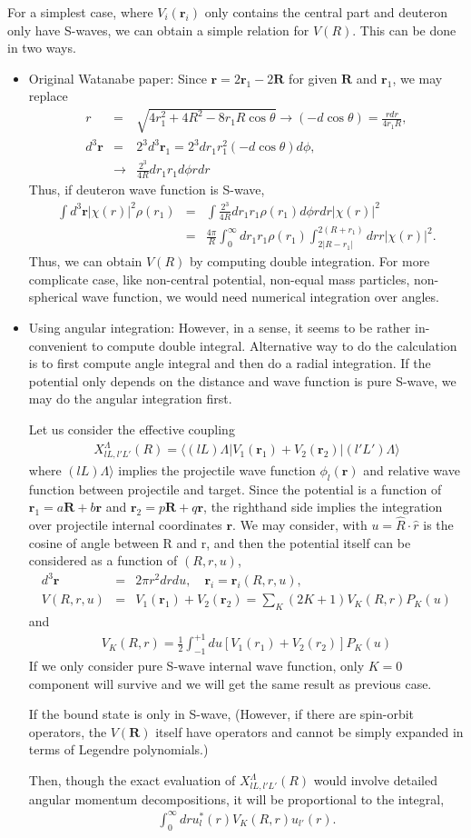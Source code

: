\documentclass[11pt]{book}
\def\bm{\boldsymbol}
\def\vr{{\bm r}}
\def\vR{{\bm R}}
\def\la{\langle}
\def\ra{\rangle}
\newcommand{\bea}{\begin{eqnarray}}
\newcommand{\eea}{\end{eqnarray}}
\newcommand{\no}{\nonumber \\}
\begin{document}
For a simplest case, where 
$V_i(\vr_i)$ only contains the central part and deuteron only have S-waves,
we can obtain a simple relation for $V(R)$.
This can be done in two ways. 
\begin{itemize}
\item Original Watanabe paper:
Since $\vr=2\vr_1-2\vR$ for given $\vR$ and $\vr_1$, we may replace
\bea 
r &=& \sqrt{4r_1^2+4R^2-8r_1 R\cos\theta}\to (-d\cos\theta)=\frac{rdr}{4 r_1 R}, \no 
d^3\vr&=& 2^3  d^3 \vr_1 = 2^3 d r_1 r_1^2 (-d\cos\theta) d\phi, \no 
      &\to& \frac{2^3}{4R} d r_1 r_1 d\phi r dr
\eea 
Thus, if deuteron wave function is S-wave,
\bea 
\int d^3\vr |\chi(r)|^2 \rho(r_1)
&=& \int \frac{2^3}{4R} d r_1 r_1 \rho(r_1) d\phi r dr |\chi(r)|^2 \no 
&=& \frac{4\pi}{R}\int_0^\infty dr_1 r_1 \rho(r_1) 
                          \int_{2|R-r_1|}^{2(R+r_1)} dr r |\chi(r)|^2.
\eea 
Thus, we can obtain $V(R)$ by computing double integration. 
For more complicate case, like non-central potential, non-equal mass particles,
non-spherical wave function, we would need numerical integration over angles.

\item Using angular integration:
However, in a sense, it seems to be rather in-convenient to compute 
double integral. Alternative way to do the calculation is to first compute angle
integral and then do a radial integration. 
If the potential only depends on the distance and wave function is 
pure S-wave, we may do the angular integration first.

Let us consider the effective coupling
\bea 
X^\Lambda_{lL,l'L'}(R)=\la (l L)\Lambda | V_1(\vr_1)+V_2(\vr_2)|(l' L')\Lambda\ra 
\eea 
where $(lL)\Lambda\ra$ implies the projectile wave function $\phi_l(\vr)$
and relative wave function between projectile and target. 
Since the potential is a function of $\vr_1=a \vR+b \vr$ and
$\vr_2=p \vR+ q\vr$, the righthand side implies the integration
over projectile internal coordinates $\vr$. 
We may consider, with $u=\hat{R}\cdot\hat{r}$ is the cosine of angle between
R and r, and then the potential itself can be considered as a function of 
$(R,r,u)$, 
\bea 
d^3\vr &=& 2\pi r^2 dr  du,\quad \vr_i=\vr_i(R,r,u),\no 
V(R,r,u)&=&V_1(\vr_1)+V_2(\vr_2)=\sum_{K} (2K+1)V_K(R,r) P_K(u)
\eea 
and 
\bea 
V_{K}(R,r)=\frac{1}{2}\int_{-1}^{+1} du \left[V_1(r_1)+V_2(r_2) \right]P_K(u) 
\eea 
If we only consider pure S-wave internal wave function,
only $K=0$ component will survive and we will get the same result as previous case. 

If the bound state is only in S-wave, 
(However, if there are spin-orbit operators, the $V(\vR)$ itself have 
operators and cannot be simply expanded in terms of Legendre polynomials.)  

Then, though the exact evaluation of $X^\Lambda_{lL,l'L'}(R)$
would involve detailed angular momentum decompositions,
it will be proportional to the integral,
\bea 
\int_0^\infty dr u^*_{l}(r) V_K(R,r) u_{l'}(r). 
\eea 

\end{itemize}
 
\end{document}
